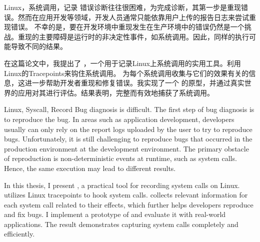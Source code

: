 
\begin{中文摘要}{Linux，系统调用，记录}
    错误诊断往往很困难，为完成诊断，其第一步是重现错误。然而在应用开发等领域，开发人员通常只能依靠用户上传的报告日志来尝试重现错误。
    不幸的是，要在开发环境中重现发生在生产环境中的错误仍然是一个挑战。重现的主要障碍是运行时的非决定性事件，如系统调用。因此，同样的执行可能导致不同的结果。

    在这篇论文中，我提出了 \TheName ，一个用于记录Linux上系统调用的实用工具。\TheName 利用Linux的Tracepoints来钩住系统调用。
    \TheName 为每个系统调用收集与它们的效果有关的信息，这进一步帮助开发者重现和修复错误。我实现了一个 \TheName 的原型，并通过真实世界的应用对其进行评估。结果表明，\TheName 完整而有效地捕获了系统调用。
\end{中文摘要}


\begin{英文摘要}{Linux, Syscall, Record}
    Bug diagnosis is difficult. The first step of bug diagnosis is to reproduce the bug. In areas such as application development, developers usually can only rely on the report logs uploaded by the user to try to reproduce bugs.
    Unfortunately, it is still challenging to reproduce bugs that occurred in the production environment at the development environment. The primary obstacle of reproduction is non-deterministic events at runtime, such as system calls. Hence,  the same execution may lead to different results.

    In this thesis, I present \TheName, a practical tool for recording system calls on Linux. \TheName utilizes Linux tracepoints to hook system calls.
    \TheName collects relevant information for each system call related to their effects, which further helps developers reproduce and fix bugs. I implement a prototype of \TheName and evaluate it with real-world applications. The result demonstrates \TheName capturing system calls completely and efficiently. 
\end{英文摘要}
